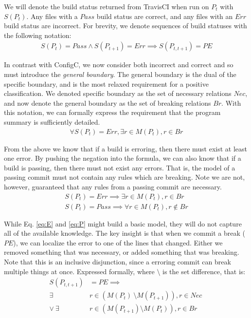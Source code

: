 We will denote the build status returned from TravisCI when run on $P_t$ with $S(P_t)$.
Any files with a $Pass$ build status are correct, and any files with an $Err$ build status are incorrect.
For brevity, we denote sequences of build statuses with the following notation:
\begin{align*}
  S(P_t)=Pass \land S(P_{t+1})=Err \implies S(P_{t,t+1}) = PE
\end{align*}

In contrast with ConfigC, we now consider both incorrect and correct and so must introduce the \textit{general boundary}.
The general boundary is the dual of the specific boundary, and is the most relaxed requirement for a positive classification.
We denoted specific boundary as the set of necessary relations $Nec$, and now denote the general boundary as the set of breaking relations $Br$.
With this notation, we can formally express the requirement that the program summary is sufficiently detailed.
\begin{align}
  \forall S(P_t)=Err, \exists r \in M(P_t), r \in Br \label{eq:E1}
\end{align}

From the above we know that if a build is erroring, then there must exist at least one error.
By pushing the negation into the formula, we can also know that if a build is passing, then there must not exist any errors.
That is, the model of a passing commit must not contain any rules which are breaking.
Note we are not, however, guaranteed that any rules from a passing commit are necessary.
\begin{align}
  S(P_t) = Err \implies \exists r \in  M (P_t), r \in Br \label{eq:E}\\
  S(P_t) = Pass \implies \forall r \in  M (P_t), r \notin Br \label{eq:P}
\end{align}

While Eq. \ref{eq:E} and \ref{eq:P} might build a basic model, they will do not capture all of the available knowledge.
The key insight is that when we commit a break ($PE$), we can localize the error to one of the lines that changed.
Either we removed something that was necessary, or added something that was breaking.
Note that this is an inclusive disjunction, since a erroring commit can break multiple things at once.
Expressed formally, where $\setminus$ is the set difference, that is:
\begin{align}
  S(P_{t,t+1}) &= PE \implies \nonumber \\
  \exists& r \in (M(P_{t})\ \setminus M(P_{t+1})), r \in Nec\ \nonumber \\
  \lor \ \exists& r \in (M(P_{t+1}) \setminus M(P_{t})), r \in Br \label{eq:PE}
\end{align}

